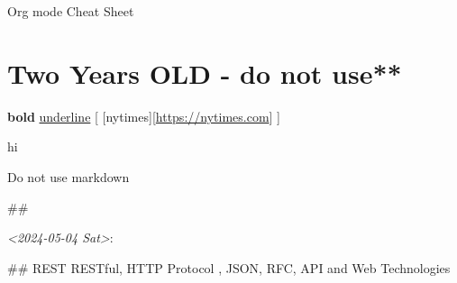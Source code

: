 \documentclass[11pt]{article}
\author{jim}
\date{\today}
\title{}
\begin{document}
\tableofcontents

Org mode Cheat Sheet


\section{Two Years OLD - do not use**}
\label{sec:orgaf595d3}
\textbf{bold}
\uline{underline}
[ [nytimes][\url{https://nytimes.com}] ]

\begin{center}
hi
\end{center}


Do not use markdown

\#\#


\textit{<2024-05-04 Sat>}:

\#\# REST RESTful, HTTP Protocol , JSON, RFC, API and Web Technologies
\end{document}
